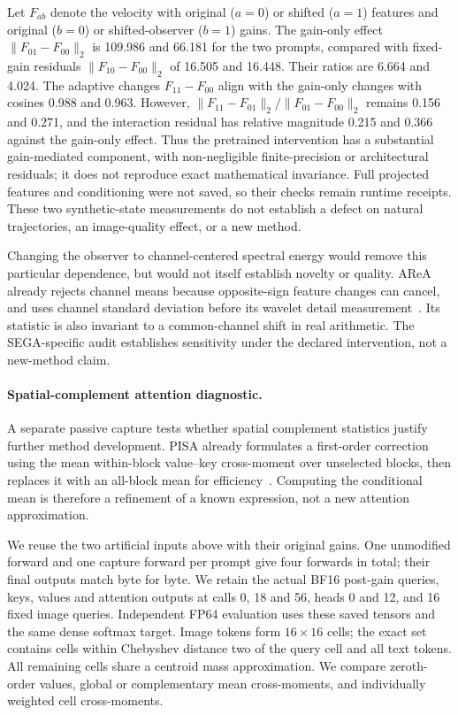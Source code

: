 Let $F_{ab}$ denote the velocity with original ($a=0$) or shifted ($a=1$)
features and original ($b=0$) or shifted-observer ($b=1$) gains.
The gain-only effect $\|F_{01}-F_{00}\|_2$ is 109.986 and 66.181 for the two
prompts, compared with fixed-gain residuals $\|F_{10}-F_{00}\|_2$ of 16.505
and 16.448. Their ratios are 6.664 and 4.024. The adaptive changes
$F_{11}-F_{00}$ align with the gain-only changes with cosines 0.988 and 0.963.
However, $\|F_{11}-F_{01}\|_2/\|F_{01}-F_{00}\|_2$ remains 0.156 and 0.271,
and the interaction residual has relative magnitude 0.215 and 0.366 against
the gain-only effect. Thus the pretrained intervention has a substantial
gain-mediated component, with non-negligible finite-precision or architectural
residuals; it does not reproduce exact mathematical invariance. Full projected
features and conditioning were not saved, so their checks remain runtime
receipts. These two synthetic-state measurements do not establish a defect on
natural trajectories, an image-quality effect, or a new method.

Changing the observer to channel-centered spectral energy would remove this
particular dependence, but would not itself establish novelty or quality.
AReA already rejects channel means because opposite-sign feature changes can
cancel, and uses channel standard deviation before its wavelet detail
measurement~\citep{area2026}. Its statistic is also invariant to a common-channel
shift in real arithmetic. The SEGA-specific audit establishes sensitivity under
the declared intervention, not a new-method claim.

\paragraph{Spatial-complement attention diagnostic.}
A separate passive capture tests whether spatial complement statistics justify
further method development. PISA already formulates a first-order correction
using the mean within-block value--key cross-moment over unselected blocks,
then replaces it with an all-block mean for efficiency~\citep{li2026pisa}.
Computing the conditional mean is therefore a refinement of a known expression,
not a new attention approximation.

We reuse the two artificial inputs above with their original gains. One
unmodified forward and one capture forward per prompt give four forwards in
total; their final outputs match byte for byte. We retain the actual BF16
post-gain queries, keys, values and attention outputs at calls 0, 18 and 56,
heads 0 and 12, and 16 fixed image queries. Independent FP64 evaluation uses
these saved tensors and the same dense softmax target. Image tokens form
$16\times16$ cells; the exact set contains cells within Chebyshev distance two
of the query cell and all text tokens. All remaining cells share a centroid
mass approximation. We compare zeroth-order values, global or complementary
mean cross-moments, and individually weighted cell cross-moments.

